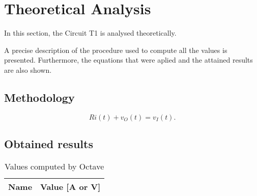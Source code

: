 \section{Theoretical Analysis}
\label{sec:analysis}



In this section, the Circuit T1 is analysed theoretically.

A precise description of the procedure used to compute all the values is presented.
Furthermore, the equations that were aplied and the attained results are also shown.



\subsection{Methodology}



\begin{equation}
	Ri(t) + v_O(t) = v_I(t).
	\label{eq:kvl}
\end{equation}



\subsection{Obtained results} 






\begin{table}[h]
	\centering
	\begin{tabular}{|l|r|}
    		\hline    
    		{\bf Name} & {\bf Value [A or V]} \\ \hline
    		
  	\end{tabular}
  	
  	\caption{Values computed by Octave}
 
\label{tab:teste}
\end{table}


